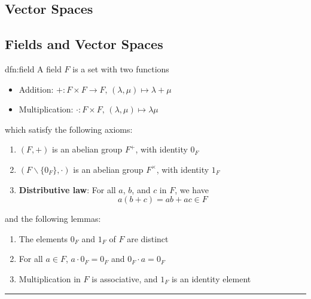 \documentclass[landscape, 8pt]{extarticle}
\begin{document}
\setlength{\abovedisplayskip}{3.5pt}
\setlength{\belowdisplayskip}{3.5pt}
\setlength{\abovedisplayshortskip}{3.5pt}
\setlength{\belowdisplayshortskip}{3.5pt}

\begin{multicols}{3}
\raggedcolumns

\section{Vector Spaces}
\subsection{Fields and Vector Spaces}

\begin{dfn}{dfn:field}{}
    A {field} $F$ is a set with two functions
    \begin{itemize}
        \setlength\itemsep{0em}
        \item Addition: $+ : F \times F \to F,\,(\lambda, \mu) \mapsto \lambda + \mu$
        \item Multiplication: $\cdot : F \times F,\, (\lambda, \mu) \mapsto \lambda\mu$
    \end{itemize}
    which satisfy the following axioms:
    \begin{enumerate}
        \setlength\itemsep{0em}
        \item $(F, +)$ is an abelian group $F^{+}$, with identity $0_{F}$
        \item $(F\backslash \{0_{F}\}, \cdot)$ is an abelian group $F^{\times}$, with identity $1_{F}$
        \item \textbf{Distributive law}: For all $a$, $b$, and $c$ in $F$, we have
            \[a(b + c) = ab + ac \in F\]
    \end{enumerate}

    \vspace{-5pt}
    and the following lemmas:
    \begin{enumerate}
        \setlength\itemsep{0em}
        \item The elements $0_{F}$ and $1_{F}$ of $F$ are distinct
        \item For all $a\in F$, $a \cdot 0_{F} = 0_{F} $ and $0_{F} \cdot a = 0_{F}$
        \item Multiplication in $F$ is associative, and $1_{F}$ is an identity element
    \end{enumerate}

    \vspace{-5pt}
    \noindent\rule{\textwidth}{0.2pt}


\end{dfn}
\end{multicols}
\end{document}
